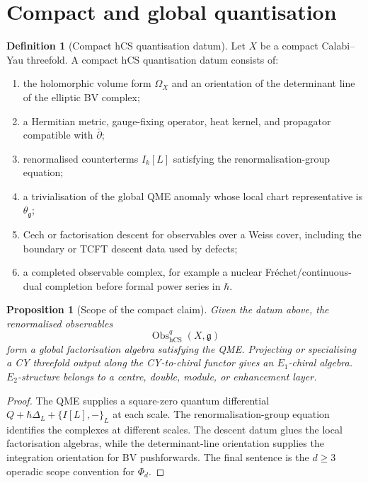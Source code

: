 \documentclass[11pt]{amsart}
\providecommand{\dbar}{\bar{\partial}}
\providecommand{\g}{\mathfrak{g}}
\providecommand{\hCS}{\mathrm{hCS}}
\providecommand{\Obs}{\operatorname{Obs}}
\theoremstyle{plain}
\newtheorem{proposition}[theorem]{Proposition}
\theoremstyle{definition}
\newtheorem{definition}[theorem]{Definition}
\theoremstyle{remark}
\begin{document}
\section{Compact and global quantisation}

\begin{definition}[Compact hCS quantisation datum]
Let \(X\) be a compact Calabi--Yau threefold. A compact hCS
quantisation datum consists of:
\begin{enumerate}
\item the holomorphic volume form \(\Omega_X\) and an orientation of the
  determinant line of the elliptic BV complex;
\item a Hermitian metric, gauge-fixing operator, heat kernel, and
  propagator compatible with \(\dbar\);
\item renormalised counterterms \(I_k[L]\) satisfying the
  renormalisation-group equation;
\item a trivialisation of the global QME anomaly whose local chart
  representative is \(\theta_\g\);
\item Cech or factorisation descent for observables over a Weiss cover,
  including the boundary or TCFT descent data used by defects;
\item a completed observable complex, for example a nuclear
  Fréchet/continuous-dual completion before formal power series in
  \(\hbar\).
\end{enumerate}
\end{definition}

\begin{proposition}[Scope of the compact claim]
Given the datum above, the renormalised observables
\[
  \Obs^q_{\hCS}(X,\g)
\]
form a global factorisation algebra satisfying the QME. Projecting or
specialising a CY threefold output along the CY-to-chiral functor gives
an \(E_1\)-chiral algebra. \(E_2\)-structure belongs to a centre,
double, module, or enhancement layer.
\end{proposition}

\begin{proof}
The QME supplies a square-zero quantum differential
\(Q+\hbar\Delta_L+\{I[L],-\}_L\) at each scale. The
renormalisation-group equation identifies the complexes at different
scales. The descent datum glues the local factorisation algebras, while
the determinant-line orientation supplies the integration orientation
for BV pushforwards. The final sentence is the \(d\geq3\) operadic
scope convention for \(\Phi_d\).
\end{proof}
\end{document}

